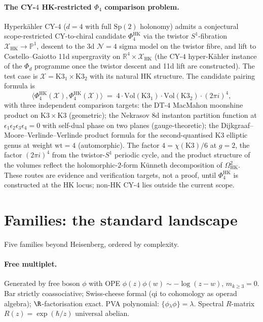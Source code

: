 \paragraph{The CY-$4$ HK-restricted $\Phi_4$ comparison problem.}
Hyperk\"ahler CY-$4$ ($d = 4$ with full $\mathrm{Sp}(2)$
holonomy) admits a conjectural scope-restricted CY-to-chiral
candidate $\Phi_4^{\mathrm{HK}}$ via the twistor $S^1$-fibration
$\mathcal X_{\mathrm{HK}} \to \mathbb P^1$, descent to the 3d
$\mathcal N = 4$ sigma model on the twistor fibre, and lift to
Costello--Gaiotto 11d supergravity on
$\mathbb R^4 \times \mathcal X_{\mathrm{HK}}$
(the CY-$4$ hyper-K\"ahler instance of the \(\Phi_d\) programme once
the twistor descent and 11d lift are constructed). The test case is
$\mathcal X = \mathrm{K3}_1 \times \mathrm{K3}_2$ with its
natural HK structure. The candidate pairing formula is
\[
 \langle \Phi_4^{\mathrm{HK}}(\mathcal X), \Phi_4^{\mathrm{HK}}(\mathcal X) \rangle
 \;=\;
 4 \cdot \mathrm{Vol}(\mathrm{K3}_1) \cdot
 \mathrm{Vol}(\mathrm{K3}_2) \cdot (2\pi i)^4,
\]
with three independent comparison targets: the DT-$4$ MacMahon
moonshine product on $\mathrm{K3} \times \mathrm{K3}$
(geometric); the Nekrasov $8$d instanton partition function at
$\epsilon_1 \epsilon_2 \epsilon_3 \epsilon_4 = 0$ with
self-dual phase on two planes (gauge-theoretic); the
Dijkgraaf--Moore--Verlinde--Verlinde product formula for the
second-quantised K3 elliptic genus at weight $\mathrm{wt} = 4$
(automorphic). The factor $4 = \chi(\mathrm{K3})/6$ at
$g = 2$, the factor $(2\pi i)^4$ from the twistor-$S^1$ periodic
cycle, and the product structure of the volumes reflect the
holomorphic-$2$-form K\"unneth decomposition of
$\Omega^2_{\mathrm{HK}}$. These routes are evidence and verification
targets, not a proof, until \(\Phi_4^{\mathrm{HK}}\) is constructed at
the HK locus; non-HK CY-$4$ lies outside the current scope.


\section*{Families: the standard landscape}

Five families beyond Heisenberg, ordered by complexity.

\paragraph{Free multiplet.}
Generated by free boson $\phi$ with OPE
$\phi(z) \phi(w) \sim -\log(z - w)$, $m_{k \geq 3} = 0$. Bar
strictly coassociative; Swiss-cheese formal (qi to cohomology
as operad algebra); $\R$-factorisation exact. PVA polynomial:
$\{\phi {}_\lambda \phi\} = \lambda$. Spectral $R$-matrix
$R(z) = \exp(\hbar/z)$ universal abelian.

